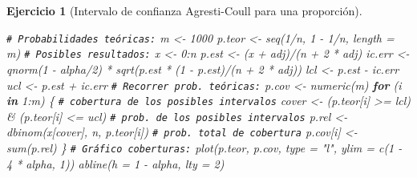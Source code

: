 \documentclass[
]{book}
\newenvironment{Shaded}{\begin{snugshade}}{\end{snugshade}}
\newcommand{\AttributeTok}[1]{\textcolor[rgb]{0.77,0.63,0.00}{#1}}
\newcommand{\CommentTok}[1]{\textcolor[rgb]{0.56,0.35,0.01}{\textit{#1}}}
\newcommand{\ControlFlowTok}[1]{\textcolor[rgb]{0.13,0.29,0.53}{\textbf{#1}}}
\newcommand{\DecValTok}[1]{\textcolor[rgb]{0.00,0.00,0.81}{#1}}
\newcommand{\FunctionTok}[1]{\textcolor[rgb]{0.00,0.00,0.00}{#1}}
\newcommand{\NormalTok}[1]{#1}
\newcommand{\OtherTok}[1]{\textcolor[rgb]{0.56,0.35,0.01}{#1}}
\newcommand{\SpecialCharTok}[1]{\textcolor[rgb]{0.00,0.00,0.00}{#1}}
\newcommand{\StringTok}[1]{\textcolor[rgb]{0.31,0.60,0.02}{#1}}
\theoremstyle{break}
\newtheorem{exercise}{Ejercicio}[chapter]
\theoremstyle{nonumberplain}
\renewcommand{\CommentTok}[1]{\textcolor[rgb]{0.41,0.41,0.41}{\texttt{#1}}}
\begin{document}
\begin{exercise}[Intervalo de confianza Agresti-Coull para una proporción]
\begin{enumerate}
\begin{Shaded}
\begin{Highlighting}[]
\CommentTok{\# Probabilidades teóricas:}
\NormalTok{m }\OtherTok{\textless{}{-}} \DecValTok{1000}
\NormalTok{p.teor }\OtherTok{\textless{}{-}} \FunctionTok{seq}\NormalTok{(}\DecValTok{1}\SpecialCharTok{/}\NormalTok{n, }\DecValTok{1} \SpecialCharTok{{-}} \DecValTok{1}\SpecialCharTok{/}\NormalTok{n, }\AttributeTok{length =}\NormalTok{ m) }
\CommentTok{\# Posibles resultados:}
\NormalTok{x }\OtherTok{\textless{}{-}} \DecValTok{0}\SpecialCharTok{:}\NormalTok{n}
\NormalTok{p.est }\OtherTok{\textless{}{-}}\NormalTok{ (x }\SpecialCharTok{+}\NormalTok{ adj)}\SpecialCharTok{/}\NormalTok{(n }\SpecialCharTok{+} \DecValTok{2} \SpecialCharTok{*}\NormalTok{ adj) }
\NormalTok{ic.err }\OtherTok{\textless{}{-}} \FunctionTok{qnorm}\NormalTok{(}\DecValTok{1} \SpecialCharTok{{-}}\NormalTok{ alpha}\SpecialCharTok{/}\DecValTok{2}\NormalTok{) }\SpecialCharTok{*} \FunctionTok{sqrt}\NormalTok{(p.est }\SpecialCharTok{*}\NormalTok{ (}\DecValTok{1} \SpecialCharTok{{-}}\NormalTok{ p.est)}\SpecialCharTok{/}\NormalTok{(n }\SpecialCharTok{+} \DecValTok{2} \SpecialCharTok{*}\NormalTok{ adj))  }
\NormalTok{lcl }\OtherTok{\textless{}{-}}\NormalTok{ p.est }\SpecialCharTok{{-}}\NormalTok{ ic.err }
\NormalTok{ucl }\OtherTok{\textless{}{-}}\NormalTok{ p.est }\SpecialCharTok{+}\NormalTok{ ic.err }
\CommentTok{\# Recorrer prob. teóricas:}
\NormalTok{p.cov }\OtherTok{\textless{}{-}} \FunctionTok{numeric}\NormalTok{(m)}
\ControlFlowTok{for}\NormalTok{ (i }\ControlFlowTok{in} \DecValTok{1}\SpecialCharTok{:}\NormalTok{m) \{}
  \CommentTok{\# cobertura de los posibles intervalos}
\NormalTok{  cover }\OtherTok{\textless{}{-}}\NormalTok{ (p.teor[i] }\SpecialCharTok{\textgreater{}=}\NormalTok{ lcl) }\SpecialCharTok{\&}\NormalTok{ (p.teor[i] }\SpecialCharTok{\textless{}=}\NormalTok{ ucl)  }
  \CommentTok{\# prob. de los posibles intervalos}
\NormalTok{  p.rel }\OtherTok{\textless{}{-}} \FunctionTok{dbinom}\NormalTok{(x[cover], n, p.teor[i])           }
  \CommentTok{\# prob. total de cobertura}
\NormalTok{  p.cov[i] }\OtherTok{\textless{}{-}} \FunctionTok{sum}\NormalTok{(p.rel)                            }
\NormalTok{\}}
\CommentTok{\# Gráfico coberturas:}
\FunctionTok{plot}\NormalTok{(p.teor, p.cov, }\AttributeTok{type =} \StringTok{"l"}\NormalTok{, }\AttributeTok{ylim =} \FunctionTok{c}\NormalTok{(}\DecValTok{1} \SpecialCharTok{{-}} \DecValTok{4} \SpecialCharTok{*}\NormalTok{ alpha, }\DecValTok{1}\NormalTok{))}
\FunctionTok{abline}\NormalTok{(}\AttributeTok{h =} \DecValTok{1} \SpecialCharTok{{-}}\NormalTok{ alpha, }\AttributeTok{lty =} \DecValTok{2}\NormalTok{) }
\end{Highlighting}
\end{Shaded}


\end{enumerate}
\end{exercise}
\end{document}
